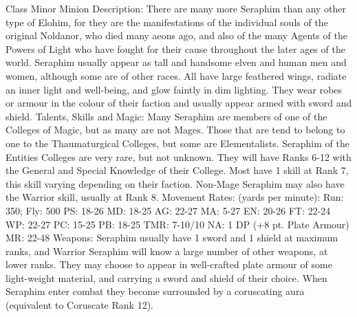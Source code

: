 \begin{Description}

\item[Class] Minor Minion
Description: There are many more Seraphim than any other type of Elohim, for they are the manifestations of the individual souls of the original Noldanor, who died many aeons ago, and also of the many Agents of the Powers of Light who have fought for their cause throughout the later ages of the world. Seraphim usually appear as tall and handsome elven and human men and women, although some are of other races. All have large feathered wings, radiate an inner light and well-being, and glow faintly in dim lighting. They wear robes or armour in the colour of their faction and usually appear armed with sword and shield.
Talents, Skills and Magic: Many Seraphim are members of one of the Colleges of Magic, but as many are not Mages. Those that are tend to belong to one to the Thaumaturgical Colleges, but some are Elementalists. Seraphim of the Entities Colleges are very rare, but not unknown. They will have Ranks 6-12 with the General and Special Knowledge of their College. Most have 1 skill at Rank 7, this skill varying depending on their faction. Non-Mage Seraphim may also have the Warrior skill, usually at Rank 8.
Movement Rates: (yards per minute): Run: 350; Fly: 500
PS: 18-26		MD: 18-25	AG: 22-27	MA: 5-27
EN: 20-26	FT: 22-24	WP: 22-27	PC: 15-25
PB: 18-25	TMR: 7-10/10	NA: 1 DP (+8 pt. Plate Armour)
MR: 22-48
Weapons: Seraphim usually have 1 sword and 1 shield at maximum ranks, and Warrior Seraphim will know a large number of other weapons, at lower ranks. They may choose to appear in well-crafted plate armour of some light-weight material, and carrying a sword and shield of their choice. When Seraphim enter combat they become surrounded by a coruscating aura (equivalent to Coruscate Rank 12).
\end{Description}

